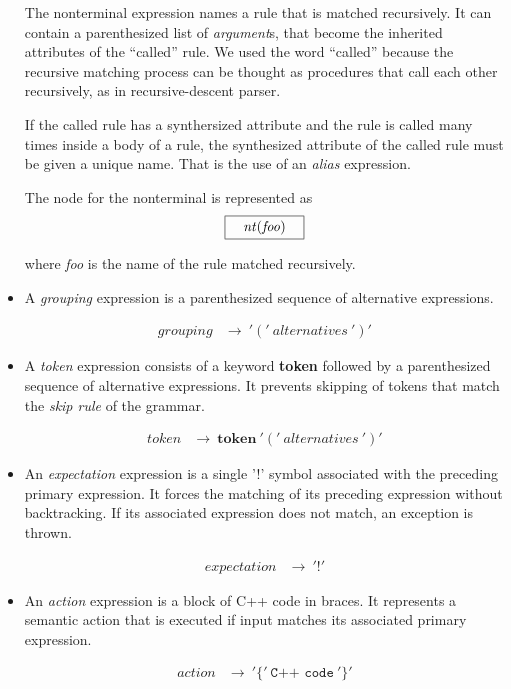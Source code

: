 \documentclass[a4paper,oneside,11pt]{book}
\theoremstyle{definition}
\begin{document}
\begin{itemize}
The nonterminal expression names a rule that is matched recursively.
It can contain a parenthesized list of \emph{argument}s, that become the inherited attributes of the ``called'' rule.
We used the word ``called'' because the recursive matching process can be thought as procedures that call each other recursively,
as in recursive-descent parser.

If the called rule has a synthersized attribute and the rule is called many times inside a body of a rule,
the synthesized attribute of the called rule must be given a unique name. That is the use of an \emph{alias} expression.

The node for the nonterminal is represented as $$\framebox[2cm][c]{\emph{nt}(\emph{foo})}$$

where \emph{foo} is the name of the rule matched recursively.

\item
A \emph{grouping} expression is a parenthesized sequence of alternative expressions.

\begin{align*}
grouping &\rightarrow \> '(' \> alternatives \> ')'
\end{align*}

\item
A \emph{token} expression consists of a keyword \textbf{token} followed by a parenthesized sequence of alternative expressions.
It prevents skipping of tokens that match the \emph{skip rule} of the grammar.

\begin{align*}
token &\rightarrow \> \textbf{token} \>'(' \> alternatives \> ')'
\end{align*}

\item
An \emph{expectation} expression is a single '!' symbol associated with the preceding primary expression.
It forces the matching of its preceding expression without backtracking.
If its associated expression does not match, an exception is thrown.

\begin{align*}
expectation &\rightarrow \> '!'
\end{align*}

\item
An \emph{action} expression is a block of C++ code in braces.
It represents a semantic action that is executed if input matches its associated primary expression.

\begin{align*}
action &\rightarrow \> '\{' \> \texttt{C++ code} \> '\}'
\end{align*}

\end{itemize}
\end{document}
